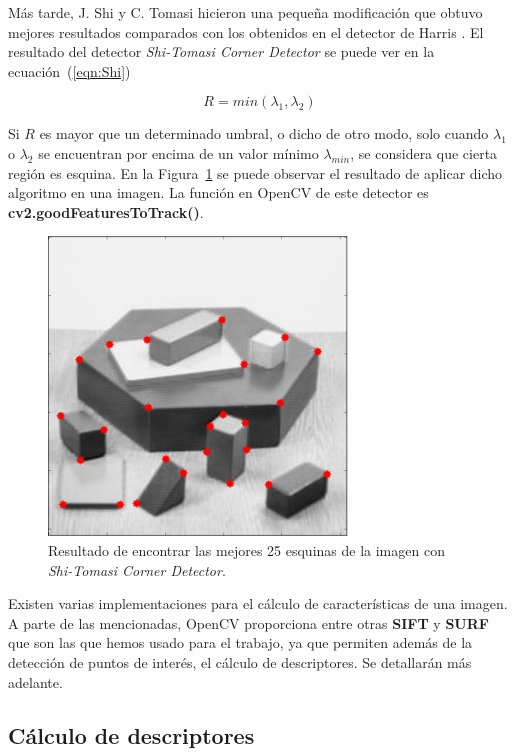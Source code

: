 Más tarde, J. Shi y C. Tomasi hicieron una pequeña modificación que obtuvo mejores resultados comparados con los obtenidos en el detector de Harris \parencite{Reference9}. El resultado del detector \textit{Shi-Tomasi Corner Detector} se puede ver en la ecuación~(\ref{eqn:Shi})

\begin{equation}
R=min(\lambda_{1},\lambda_{2})
\label{eqn:Shi}
\end{equation}

Si $R$ es mayor que un determinado umbral, o dicho de otro modo, solo cuando $\lambda_{1}$ o $\lambda_{2}$ se encuentran por encima de un valor mínimo $\lambda_{min}$, se considera que cierta región es esquina. En la Figura~\ref{fig:shi_detector} se puede observar el resultado de aplicar dicho algoritmo en una imagen. La función en OpenCV de este detector es \textbf{cv2.goodFeaturesToTrack()}.

\begin{figure}[ht]
\centering
\includegraphics[scale=0.5]{Figures/shi-detector.jpg}
\decoRule
\caption[Ejemplo con \textit{Shi-Tomasi Corner Detector}]{Resultado de encontrar las mejores 25 esquinas de la imagen con \textit{Shi-Tomasi Corner Detector}.}
\label{fig:shi_detector}
\end{figure}

Existen varias implementaciones para el cálculo de características de una imagen. A parte de las mencionadas, OpenCV proporciona entre otras \textbf{SIFT} y \textbf{SURF} que son las que hemos usado para el trabajo, ya que permiten además de la detección de puntos de interés, el cálculo de descriptores. Se detallarán más adelante.

\subsection{Cálculo de descriptores}


